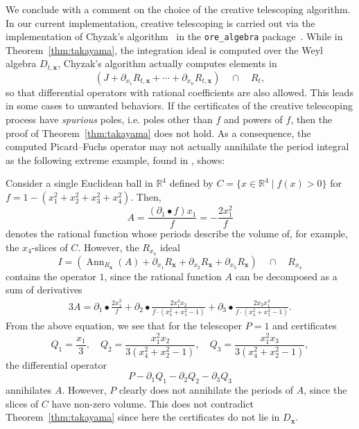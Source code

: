 \documentclass[sigconf, nonacm]{acmart} %
\begin{document}
\vspace{0.3cm}

We conclude with a comment on the choice of the creative telescoping algorithm. In our current implementation,  creative telescoping is carried out via the implementation of Chyzak's algorithm~\cite{chyzak'salgorithm} in the \texttt{ore\_algebra} package~\cite{KauersMezzarobba2019}. While in Theorem~\ref{thm:takayama}, the integration ideal is computed over the Weyl algebra $D_{t,\mathbf{x}}$, Chyzak's algorithm actually computes elements in
\begin{equation}
     (J + \partial_{x_1}R_{t, \textbf{x}} + \cdots +\partial_{x_n} R_{t,\textbf{x}} ) \quad \cap  \quad  R_t,
\end{equation}
so that differential operators with rational coefficients are also allowed.
This leads in some cases to unwanted behaviors. 
If the certificates of the creative telescoping process have {\em spurious} poles, i.e. poles other than $f$ and powers of $f$, 
then the proof of Theorem~\ref{thm:takayama} does not hold. 
As a consequence, the computed Picard--Fuchs operator may not actually annihilate the period integral as the following extreme example, found in \cite{Mezzarobba-volumes-repo}, shows:

\begin{example}\label{eg:spurious poles}
    Consider a single 
    Euclidean ball in $\mathbb{R}^4$ defined by $C =  \{x \in \mathbb{R}^4 \mid f(x)>0\}$ for $f = 1 - (x_1^2 + x_2^2 + x_3^2 + x_4^2)$. Then, $$A = \frac{(\partial_1\bullet f)x_1}{f} = -\frac{2 x_1^2}{f}$$ denotes the rational function whose periods describe the volume of, for example, the $x_4$-slices of $C$. However, the $R_{x_4}$ ideal
    \begin{equation}
        I = (\operatorname{Ann}_{R_{\mathbf{x}}}(A) + \partial_{x_1}R_{ \textbf{x}} + \partial_{x_2}R_{ \textbf{x}} + \partial_{x_3}R_{ \textbf{x}} ) \quad \cap  \quad  R_{x_4}
    \end{equation}
    contains the operator $1$, since the rational function $A$ can be decomposed as a sum of derivatives 
    \begin{align*}
        3A = \partial_{1}\bullet\frac{ 2x_1^3}{f} + \partial_{2}\bullet \frac{ 2x_1^4x_2}{f\cdot(x_4^2+x_1^2-1)}+\partial_{3} \bullet \frac{2x_3x_1^4}{f\cdot(x_4^2+x_1^2-1)}.
    \end{align*}
    From the above equation, we see that for the telescoper $P = 1$ and certificates
    $$Q_1=\frac{x_1}{3},\quad Q_2=\frac{x_1^2 x_2}{3(x_4^2 + x_2^2 - 1)},\quad Q_3 = \frac{x_1^2 x_3}{3(x_4^2 + x_2^2 - 1)},$$ the differential operator $$P - \partial_1 Q_1 - \partial_2 Q_2 - \partial_3 Q_3$$ annihilates $A$. However, $P$ clearly does not annihilate the periods of $A$, since the slices of $C$ have non-zero volume. This does not contradict Theorem~\ref{thm:takayama} since here the certificates do not lie in $D_\mathbf{x}$. 
\end{example}
\end{document}
